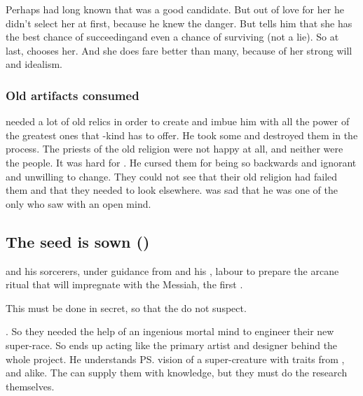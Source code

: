 Perhaps \Semiza{} had long known that \Ilu{} was a good candidate. But out of love for her he didn't select her at first, because he knew the danger. But \Daggerrain{} tells him that she has the best chance of succeeding\dash and even a chance of surviving (not a lie). So at last, \Semiza{} chooses her. And she does fare better than many, because of her strong will and idealism. 





\subsubsection{Old artifacts consumed}
\Semiza needed a lot of old \aryoth relics in order to create \Thanatzil and imbue him with all the power of the greatest ones that \nephil-kind has to offer.
He took some  and destroyed them in the process.
The priests of the old religion were not happy at all, and neither were the people.
It was hard for \Semiza.
He cursed them for being so backwards and ignorant and unwilling to change.
They could not see that their old religion had failed them and that they needed to look elsewhere.
\Semiza was sad that he was one of the only \nephilim who saw with an open mind.









\subsection{The seed is sown ()}
\Semiza{} and his sorcerers, under guidance from \Daggerrain{} and his \banelords, labour to prepare the arcane ritual that will impregnate \Ilu{} with the Messiah, the first \resphan. 

This must be done in secret, so that the \dragons{} do not suspect.

. So they needed the help of an ingenious mortal mind to engineer their new super-race.
So \Semiza{} ends up acting like the primary artist and designer behind the whole \resphan{} project. He understands \ps{\Daggerrain}{} vision of a super-creature with traits from \banes, \voyagers{} and \nephilim{} alike. The \banes{} can supply them with knowledge, but they must do the research themselves.

